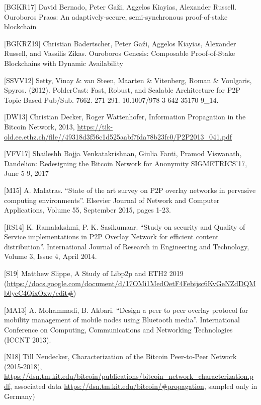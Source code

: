 \documentclass[11pt,a4paper]{article}
\begin{document}
{[}BGKR17{]} David Bernado, Peter Gaži, Aggelos Kiayias, Alexander
Russell. Ouroboros Praos: An adaptively-secure, semi-synchronous
proof-of-stake blockchain

{[}BGKRZ19{]} Christian Badertscher, Peter Gaži, Aggelos Kiayias,
Alexander Russell, and Vassilis Zikas. Ouroboros Genesis: Composable
Proof-of-Stake Blockchains with Dynamic Availability

{[}SSVV12{]} Setty, Vinay \& van Steen, Maarten \& Vitenberg, Roman \&
Voulgaris, Spyros. (2012). PolderCast: Fast, Robust, and Scalable
Architecture for P2P Topic-Based Pub/Sub. 7662. 271-291.
10.1007/978-3-642-35170-9\_14.

{[}DW13{]} Christian Decker, Roger Wattenhofer, Information Propagation
in the Bitcoin Network, 2013,
\href{https://tik-old.ee.ethz.ch/file//49318d3f56c1d525aabf7fda78b23fc0/P2P2013_041.pdf}{{https://tik-old.ee.ethz.ch/file//49318d3f56c1d525aabf7fda78b23fc0/P2P2013\_041.pdf}}

{[}VFV17{]} Shaileshh Bojja Venkatakrishnan, Giulia Fanti, Pramod
Viswanath, Dandelion: Redesigning the Bitcoin Network for Anonymity
SIGMETRICS'17, June 5-9, 2017

{[}M15{]} A. Malatras. ``State of the art survey on P2P overlay networks
in pervasive computing environments''. Elsevier Journal of Network and
Computer Applications, Volume 55, September 2015, pages 1-23.

{[}RS14{]} K. Ramalakshmi, P. K. Sasikumaar. ``Study on security and
Quality of Service implementations in P2P Overlay Network for efficient
content distribution''. International Journal of Research in Engineering
and Technology, Volume 3, Issue 4, April 2014.

{[}S19{]} Matthew Slippe, A Study of Libp2p and ETH2 2019
(\href{https://docs.google.com/document/d/17OMi1MedOetF4Febijsc6KvGeNZdDQMb0yeC4QixOxw/edit\#}{{https://docs.google.com/document/d/17OMi1MedOetF4Febijsc6KvGeNZdDQMb0yeC4QixOxw/edit\#}})

{[}MA13{]} A. Mohammadi, B. Akbari. ``Design a peer to peer overlay
protocol for mobility management of mobile nodes using Bluetooth
media''. International Conference on Computing, Communications and
Networking Technologies (ICCNT 2013).

{[}N18{]} Till Neudecker, Characterization of the Bitcoin Peer-to-Peer
Network (2015-2018),
\href{https://dsn.tm.kit.edu/bitcoin/publications/bitcoin_network_characterization.pdf}{{https://dsn.tm.kit.edu/bitcoin/publications/bitcoin\_network\_characterization.pdf}},
associated data
\href{https://dsn.tm.kit.edu/bitcoin/\#propagation}{{https://dsn.tm.kit.edu/bitcoin/\#propagation}},
sampled only in Germany)
\end{document}
